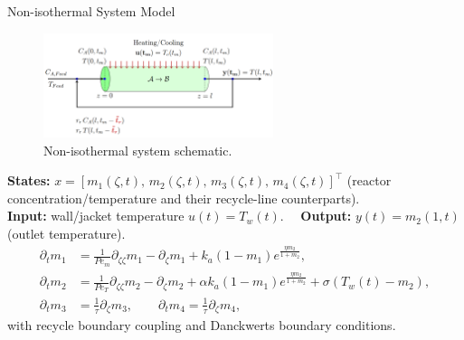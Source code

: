 \documentclass[8pt]{beamer}
\begin{document}
\begin{frame}{Non-isothermal System Model}

\begin{figure}
    \centering
    \includegraphics[width=0.6\textwidth]{figures/noniso_reactor.png}\vspace{-4mm}
    \caption{Non-isothermal system schematic.}
\end{figure}

\small
\textbf{States:} $x=[m_1(\zeta,t),\,m_2(\zeta,t),\,m_3(\zeta,t),\,m_4(\zeta,t)]^\top$ (reactor concentration/temperature and their recycle-line counterparts). \\
\textbf{Input:} wall/jacket temperature $u(t)=T_w(t)$. \ \ \textbf{Output:} $y(t)=m_2(1,t)$ (outlet temperature).\\[0.35em]
\begin{align*}
\partial_t m_1 &= \tfrac{1}{Pe_m}\partial_{\zeta\zeta} m_1 - \partial_\zeta m_1 
      + k_a\!\left(1-m_1\right)e^{\frac{\eta m_2}{1+m_2}}, \\
\partial_t m_2 &= \tfrac{1}{Pe_T}\partial_{\zeta\zeta} m_2 - \partial_\zeta m_2 
      + \alpha k_a\!\left(1-m_1\right)e^{\frac{\eta m_2}{1+m_2}} + \sigma\!\left(T_w(t)-m_2\right), \\
\partial_t m_3 &= \tfrac{1}{\tau}\partial_\zeta m_3, \qquad
\partial_t m_4 = \tfrac{1}{\tau}\partial_\zeta m_4,
\end{align*}
with recycle boundary coupling and Danckwerts boundary conditions.
\end{frame}
\end{document}
